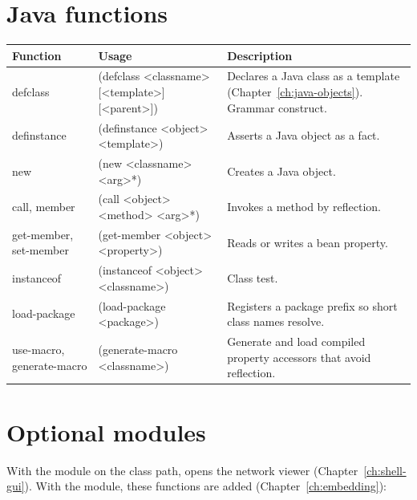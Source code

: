 \section{Java functions}

\begin{longtable}{>{\ttfamily\raggedright\arraybackslash}p{1.45in} >{\ttfamily\small\raggedright\arraybackslash}p{2.05in} >{\raggedright\arraybackslash}p{2.5in}}
\toprule
\normalfont Function & \normalfont Usage & Description \\
\midrule
\endhead
defclass & (defclass <classname> [<template>] [<parent>]) & Declares a Java class as a template (Chapter~\ref{ch:java-objects}). Grammar construct. \\
definstance & (definstance <object> <template>) & Asserts a Java object as a fact. \\
new & (new <classname> <arg>*) & Creates a Java object. \\
call, member & (call <object> <method> <arg>*) & Invokes a method by reflection. \\
get-\br{}member, set-\br{}member & (get-member <object> <property>) & Reads or writes a bean property. \\
instanceof & (instanceof <object> <classname>) & Class test. \\
load-package & (load-package <package>) & Registers a package prefix so short class names resolve. \\
use-\br{}macro, generate-\br{}macro & (generate-macro <classname>) & Generate and load compiled property accessors that avoid reflection. \\
\bottomrule
\end{longtable}

\section{Optional modules}

With the  module on the class path,  opens the network
viewer (Chapter~\ref{ch:shell-gui}). With the  module,
these functions are added (Chapter~\ref{ch:embedding}):

